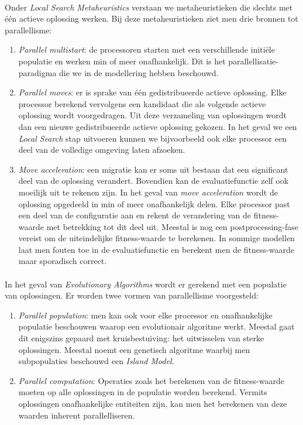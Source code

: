 \paragraph{}
Onder \emph{Local Search Metaheuristics} verstaan we metaheuristieken die slechts met \'e\'en actieve oplossing werken. Bij deze metaheuristieken ziet men drie bronnen tot parallellisme:
\begin{enumerate}
 \item \emph{Parallel multistart}: de processoren starten met een verschillende initi\"ele populatie en werken min of meer onafhankelijk. Dit is het parallellisatie-paradigma die we in de modellering hebben beschouwd.
 \item \emph{Parallel moves}: er is sprake van \'e\'en gedistribueerde actieve oplossing. Elke processor berekend vervolgens een kandidaat die als volgende actieve oplossing wordt voorgedragen. Uit deze verzameling van oplossingen wordt dan een nieuwe gedistribueerde actieve oplossing gekozen. In het geval we een \emph{Local Search} stap uitvoeren kunnen we bijvoorbeeld ook elke processor een deel van de volledige omgeving laten afzoeken.
 \item \emph{Move acceleration}: een migratie kan er soms uit bestaan dat een significant deel van de oplossing verandert. Bovendien kan de evaluatiefunctie zelf ook moeilijk uit te rekenen zijn. In het geval van \emph{move acceleration} wordt de oplossing opgedeeld in min of meer onafhankelijk delen. Elke processor past een deel van de configuratie aan en rekent de verandering van de fitness-waarde met betrekking tot dit deel uit. Meestal is nog een postprocessing-fase vereist om de uiteindelijke fitness-waarde te berekenen. In sommige modellen laat men fouten toe in de evaluatiefunctie en berekent men de fitness-waarde maar sporadisch correct.
\end{enumerate}

\paragraph{}
In het geval van \emph{Evolutionary Algorithms} wordt er gerekend met een populatie van oplossingen. Er worden twee vormen van parallellisme voorgesteld:
\begin{enumerate}
 \item \emph{Parallel population}: men kan ook voor elke processor en onafhankelijke populatie beschouwen waarop een evolutionair algoritme werkt. Meestal gaat dit enigszins gepaard met kruisbestuiving: het uitwisselen van sterke oplossingen. Meestal noemt een genetisch algoritme waarbij men subpopulaties beschouwd een \emph{Island Model}\cite{islandModel}.
 \item \emph{Parallel computation}: Operaties zoals het berekenen van de fitness-waarde moeten op alle oplossingen in de populatie worden berekend. Vermits oplossingen onafhankelijke entiteiten zijn, kan men het berekenen van deze waarden inherent parallelliseren.
\end{enumerate}


